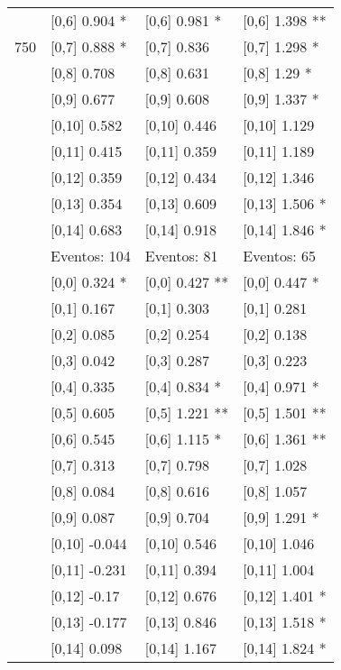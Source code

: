 \begin{table}
\begin{tabular}[t]{llll}
 & {}[0,6] 0.904 * & {}[0,6] 0.981 * & {}[0,6] 1.398 **\\
750 & {}[0,7] 0.888 * & {}[0,7] 0.836 & {}[0,7] 1.298 *\\
\addlinespace
 & {}[0,8] 0.708 & {}[0,8] 0.631 & {}[0,8] 1.29 *\\
 & {}[0,9] 0.677 & {}[0,9] 0.608 & {}[0,9] 1.337 *\\
 & {}[0,10] 0.582 & {}[0,10] 0.446 & {}[0,10] 1.129\\
 & {}[0,11] 0.415 & {}[0,11] 0.359 & {}[0,11] 1.189\\
 & {}[0,12] 0.359 & {}[0,12] 0.434 & {}[0,12] 1.346\\
\addlinespace
 & {}[0,13] 0.354 & {}[0,13] 0.609 & {}[0,13] 1.506 *\\
 & {}[0,14] 0.683 & {}[0,14] 0.918 & {}[0,14] 1.846 *\\
 & Eventos:  104 & Eventos:  81 & Eventos:  65\\
 & {}[0,0] 0.324 * & {}[0,0] 0.427 ** & {}[0,0] 0.447 *\\
 & {}[0,1] 0.167 & {}[0,1] 0.303 & {}[0,1] 0.281\\
\addlinespace
 & {}[0,2] 0.085 & {}[0,2] 0.254 & {}[0,2] 0.138\\
 & {}[0,3] 0.042 & {}[0,3] 0.287 & {}[0,3] 0.223\\
 & {}[0,4] 0.335 & {}[0,4] 0.834 * & {}[0,4] 0.971 *\\
 & {}[0,5] 0.605 & {}[0,5] 1.221 ** & {}[0,5] 1.501 **\\
 & {}[0,6] 0.545 & {}[0,6] 1.115 * & {}[0,6] 1.361 **\\
\addlinespace
1000 & {}[0,7] 0.313 & {}[0,7] 0.798 & {}[0,7] 1.028\\
 & {}[0,8] 0.084 & {}[0,8] 0.616 & {}[0,8] 1.057\\
 & {}[0,9] 0.087 & {}[0,9] 0.704 & {}[0,9] 1.291 *\\
 & {}[0,10] -0.044 & {}[0,10] 0.546 & {}[0,10] 1.046\\
 & {}[0,11] -0.231 & {}[0,11] 0.394 & {}[0,11] 1.004\\
\addlinespace
 & {}[0,12] -0.17 & {}[0,12] 0.676 & {}[0,12] 1.401 *\\
 & {}[0,13] -0.177 & {}[0,13] 0.846 & {}[0,13] 1.518 *\\
 & {}[0,14] 0.098 & {}[0,14] 1.167 & {}[0,14] 1.824 *\\
\bottomrule
\end{tabular}
\end{table}
